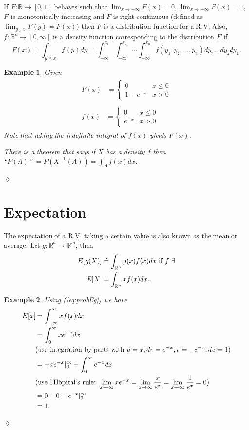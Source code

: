 \documentclass[lecture,12pt,]{pcms-l}
\theoremstyle{example}
\newtheorem{example}{Example}[section]
\begin{document}
If $F: \mathbb{R} \to [0,1]$ behaves such that $\lim_{x \to -\infty} F(x) = 0$, $\lim_{x \to +\infty} F(x) = 1$, $F$ is monotonically increasing and $F$ is right continuous (defined as $\lim_{y \downarrow x} F(y) = F(x)$) then $F$ is a distribution function for a R.V. Also, $f:\mathbb{R}^n \to [0,\infty]$ is a density function corresponding to the distribution $F$ if
$$F(x) = \int_{y \leq x} f(y)dy = \int_{-\infty}^{x_1} \int_{-\infty}^{x_2}\cdots \int_{-\infty}^{x_n} f(y_1,y_2,\ldots,y_n)dy_n\ldots dy_2dy_1.$$

\begin{example}
Given
\begin{align}
\label{eq:probEg}
\begin{split}F(x) &= \begin{cases} 0 & x \leq 0 \\ 1-e^{-x} & x > 0 \end{cases}\end{split} \nonumber \\
\begin{split}f(x) &= \begin{cases} 0 & x \leq 0 \\ e^{-x} & x > 0 \end{cases}\end{split}
\end{align}
Note that taking the indefinite integral of $f(x)$ yields $F(x)$.

There is a theorem that says if $X$ has a density $f$ then \\
``$P(A)$'' $= P\left(X^{-1}(A)\right) = \int_A f(x)dx$.
\end{example}
$\lozenge$

\section{Expectation}
The expectation of a R.V. taking a certain value is also known as the mean or average. Let $g: \mathbb{R}^n \to \mathbb{R}^m$, then
\begin{align*}
E[g(X)] &\doteq \int_{\mathbb{R}^n} g(x)f(x)dx \textnormal{ if } f ~ \exists \\
E[X] &= \int_{\mathbb{R}^n}xf(x)dx.
\end{align*}

\begin{example}
Using (\ref{eq:probEg}) we have
\begin{align*}
E[x] &= \int_{-\infty}^\infty xf(x)dx \\
&= \int_0^\infty xe^{-x}dx \\
&(\textnormal{use integration by parts with } u = x, dv = e^{-x}, v = -e^{-x}, du = 1) \\
&= -xe^{-x}\rvert_0^\infty + \int_0^\infty e^{-x}dx \\
&(\textnormal{use l'H\^opital's rule: } \lim_{x \to \infty} xe^{-x} = \lim_{x \to \infty} \frac{x}{e^x} = \lim_{x \to \infty} \frac{1}{e^x} = 0) \\
&= 0 - 0 - e^{-x}\rvert_0^\infty \\
&= 1.
\end{align*}
\end{example}
$\lozenge$
\end{document}
